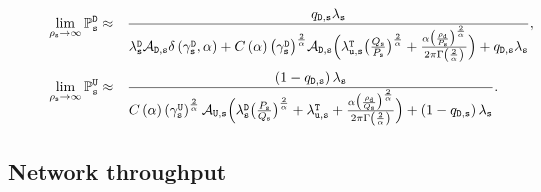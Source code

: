 \documentclass[twocolumn,english]{IEEEtran}
\theoremstyle{plain}
\theoremstyle{definition}
\begin{document}
\begin{figure*}[tbh]
\begin{eqnarray}
\lim_{\rho_{\mathtt{s}}\rightarrow\infty}\mathbb{P}_{\mathtt{s}}^{\mathtt{D}} & \approx & \frac{q_{\mathtt{D,s}}\lambda_{\mathtt{s}}}{\lambda_{\mathtt{s}}^{\mathtt{D}}\mathcal{A}_{\mathtt{D}\mathtt{,s}}\delta\left(\gamma_{\mathtt{s}}^{\mathtt{D}},\alpha\right)+C\left(\alpha\right)\bigl(\gamma_{\mathtt{s}}^{\mathtt{D}}\bigr)^{\frac{2}{\alpha}}\mathcal{A}_{\mathtt{D}\mathtt{,s}}\Bigl(\lambda_{\mathtt{u,s}}^{\mathtt{T}}\bigl(\frac{Q_{\mathtt{s}}}{P_{\mathtt{s}}}\bigr)^{\frac{2}{\alpha}}+\frac{\alpha\bigl(\frac{\rho_{\mathtt{d}}}{P_{\mathtt{s}}}\bigr)^{\frac{2}{\alpha}}}{2\pi\Gamma\left(\frac{2}{\alpha}\right)}\Bigr)+q_{\mathtt{D,s}}\lambda_{\mathtt{s}}},\label{eq:small_limit}
\end{eqnarray}
\begin{eqnarray}
\lim_{\rho_{\mathtt{s}}\rightarrow\infty}\mathbb{P}_{\mathtt{s}}^{\mathtt{U}} & \approx & \frac{\left(1-q_{\mathtt{D,s}}\right)\lambda_{\mathtt{s}}}{C\left(\alpha\right)\left(\gamma_{\mathtt{s}}^{\mathtt{U}}\right)^{\frac{2}{\alpha}}\mathcal{A}_{\mathtt{U}\mathtt{,s}}\Bigl(\lambda_{\mathtt{s}}^{\mathtt{D}}\bigl(\frac{P_{\mathtt{s}}}{Q_{\mathtt{s}}}\bigr)^{\frac{2}{\alpha}}+\lambda_{\mathtt{u,s}}^{\mathtt{T}}+\frac{\alpha\bigl(\frac{\rho_{\mathtt{d}}}{Q_{\mathtt{s}}}\bigr)^{\frac{2}{\alpha}}}{2\pi\Gamma\left(\frac{2}{\alpha}\right)}\Bigr)+\left(1-q_{\mathtt{D,s}}\right)\lambda_{\mathtt{s}}}.\label{eq:small_limit_U}
\end{eqnarray}
\end{figure*}



\subsection{Network throughput }
\end{document}
